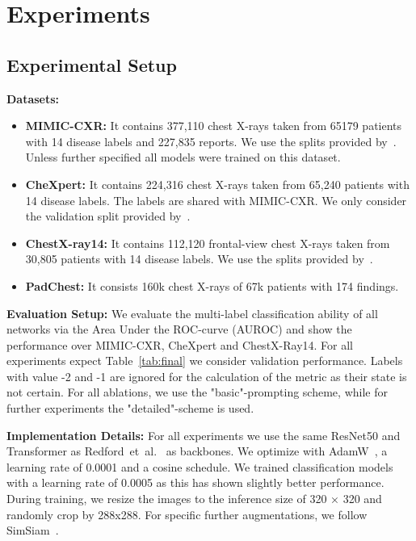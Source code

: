 \documentclass[runningheads]{llncs}
\begin{document}
 

\section{Experiments}
\subsection{Experimental Setup}
\noindent\textbf{Datasets:}
\begin{itemize}
    \item \textbf{MIMIC-CXR: } It contains 377,110 
        chest X-rays taken from 65179 patients with 14 disease labels and 227,835 reports.
        We use the splits provided by~\cite{johnson2019mimic}. Unless further specified all models were trained on this dataset. 
\item \textbf{CheXpert: } It contains 224,316
    chest X-rays taken from 65,240 patients with 14 disease labels. The labels are shared with MIMIC-CXR.
    We only consider the validation split provided by~\cite{irvin2019chexpert}.
\item \textbf{ChestX-ray14: } It contains 112,120
frontal-view chest X-rays taken from 30,805 patients with 14 disease labels.
    We use the splits provided by~\cite{seibold2020self}.
    \item \textbf{PadChest: } It consists  160k
    chest X-rays of 67k patients with 174 findings.
\end{itemize}
\noindent\textbf{Evaluation Setup: } We evaluate the multi-label classification ability of all networks via the Area Under the ROC-curve (AUROC) and show the performance over MIMIC-CXR, CheXpert and ChestX-Ray14. For all experiments expect Table~\ref{tab:final} we consider validation performance. Labels with value -2 and -1 are ignored for the calculation of the metric as their state is not certain. For all ablations, we use the "basic"-prompting scheme, while for further experiments the "detailed"-scheme is used. 

\noindent\textbf{Implementation Details: } For all experiments we use the same ResNet50 and Transformer as Redford~et~al.~\cite{radford2021learning} as backbones. We optimize with AdamW~\cite{loshchilov2017decoupled}, a learning rate of 0.0001 and a cosine schedule. We trained classification models with a learning rate of 0.0005 as this has shown slightly better performance. During training, we resize the images to the inference size of 320 × 320 and randomly crop by 288x288. For specific further augmentations, we follow SimSiam~\cite{chen2021exploring}.
\end{document}
